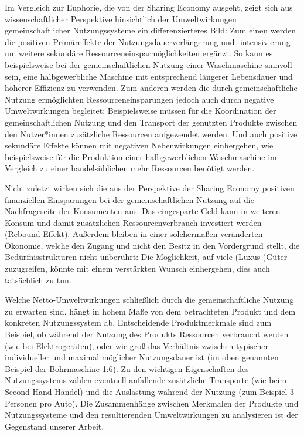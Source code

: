 \documentclass[11pt, titlepage=true]{scrartcl} %
\begin{document}
Im Vergleich zur Euphorie, die von der Sharing Economy ausgeht, zeigt sich aus wissenschaftlicher Perspektive hinsichtlich der Umweltwirkungen gemeinschaftlicher Nutzungssysteme ein differenzierteres Bild: Zum einen werden die positiven Primäreffekte der
Nutzungsdauerverlängerung und -intensivierung um weitere sekundäre
Ressourceneinsparmöglichkeiten ergänzt. So kann es beispielsweise bei der
gemeinschaftlichen Nutzung einer Waschmaschine sinnvoll sein, eine
halbgewerbliche Maschine mit entsprechend längerer Lebensdauer und höherer
Effizienz zu verwenden. Zum anderen werden die durch gemeinschaftliche Nutzung
ermöglichten Ressourceneinsparungen jedoch auch durch negative Umweltwirkungen
begleitet: Beispielsweise müssen für die Koordination der gemeinschaftlichen
Nutzung und den Transport der genutzten Produkte zwischen den Nutzer*innen zusätzliche
Ressourcen aufgewendet werden. Und auch positive sekundäre Effekte können mit negativen Nebenwirkungen einhergehen, wie beispielsweise für die Produktion einer halbgewerblichen Waschmaschine im Vergleich zu einer handelsüblichen
mehr Ressourcen benötigt werden.

Nicht zuletzt wirken sich die aus der Perspektive der Sharing Economy positiven
finanziellen Einsparungen bei der gemeinschaftlichen Nutzung auf die Nachfrageseite der
Konsumenten aus: Das eingesparte Geld kann in weiteren Konsum und damit
zusätzlichen Ressourcenverbrauch investiert werden (Rebound-Effekt). Außerdem
bleiben in einer solchermaßen veränderten Ökonomie, welche den Zugang und nicht
den Besitz in den Vordergrund stellt, die Bedürfnisstrukturen nicht unberührt:
Die Möglichkeit, auf viele (Luxus-)Güter zuzugreifen, könnte mit einem
verstärkten Wunsch einhergehen, dies auch tatsächlich zu tun.

Welche Netto-Umweltwirkungen schließlich durch die gemeinschaftliche Nutzung zu
erwarten sind, hängt in hohem Maße von dem betrachteten Produkt und dem konkreten
Nutzungssystem ab. Entscheidende Produktmerkmale sind zum Beispiel, ob während der Nutzung des Produkts Ressourcen verbraucht werden (wie bei Elektrogeräten), oder wie groß das Verhältnis zwischen typischer individueller und maximal möglicher Nutzungsdauer ist (im oben genannten Beispiel der Bohrmaschine 1:6). Zu den wichtigen Eigenschaften des Nutzungssystems zählen eventuell anfallende zusätzliche Transporte (wie beim Second-Hand-Handel) und die Auslastung während der Nutzung (zum Beispiel 3 Personen pro Auto). Die Zusammenhänge zwischen Merkmalen der Produkte und Nutzungssysteme und den resultierenden Umweltwirkungen zu analysieren ist der Gegenstand unserer Arbeit.
\end{document}
